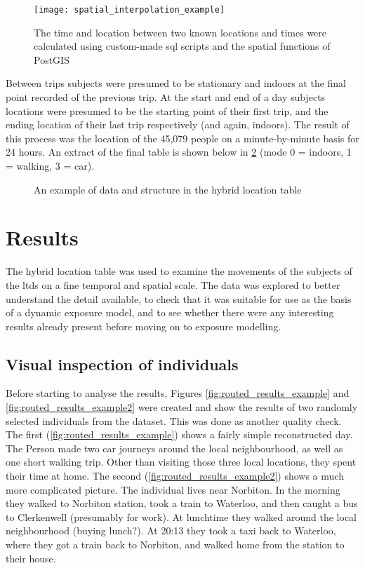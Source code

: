 \begin{figure}[H]
\centering
\texttt{[image: spatial\_interpolation\_example]}
\caption{The time and location between two known locations and times were calculated using custom-made \gls{sql} scripts and the spatial functions of PostGIS}
\label{fig:spatial_interpolation_example}
\end{figure}

Between trips subjects were presumed to be stationary and indoors at the final point recorded of the previous trip. At the start and end of a day subjects locations were presumed to be the starting point of their first trip, and the ending location of their last trip respectively (and again, indoors). The result of this process was the location of the 45,079 people on a minute-by-minute basis for 24 hours. An extract of the final table is shown below in \ref{fig:hybrid_location_table} (mode 0 = indoors, 1 = walking, 3 = car).

\begin{figure}[H]
\centering
{}
\caption{An example of data and structure in the hybrid location table}
\label{fig:hybrid_location_table}
\end{figure}

\section{Results}
\label{sec:reconstruction_results}

The hybrid location table was used to examine the movements of the subjects of the \gls{ltds} on a fine temporal and spatial scale. The data was explored to better understand the detail available, to check that it was suitable for use as the basis of a dynamic exposure model, and to see whether there were any interesting results already present before moving on to exposure modelling.

\subsection{Visual inspection of individuals}
\label{sec:visual_inspection_of_individuals}

Before starting to analyse the results, Figures \ref{fig:routed_results_example} and \ref{fig:routed_results_example2} were created and show the results of two randomly selected individuals from the dataset. This was done as another quality check. The first (\ref{fig:routed_results_example}) shows a fairly simple reconstructed day. The Person made two car journeys around the local neighbourhood, as well as one short walking trip. Other than visiting those three local locations, they spent their time at home. The second (\ref{fig:routed_results_example2}) shows a much more complicated picture. The individual lives near Norbiton. In the morning they walked to Norbiton station, took a train to Waterloo, and then caught a bus to Clerkenwell (presumably for work). At lunchtime they walked around the local neighbourhood (buying lunch?). At 20:13 they took a taxi back to Waterloo, where they got a train back to Norbiton, and walked home from the station to their house.

